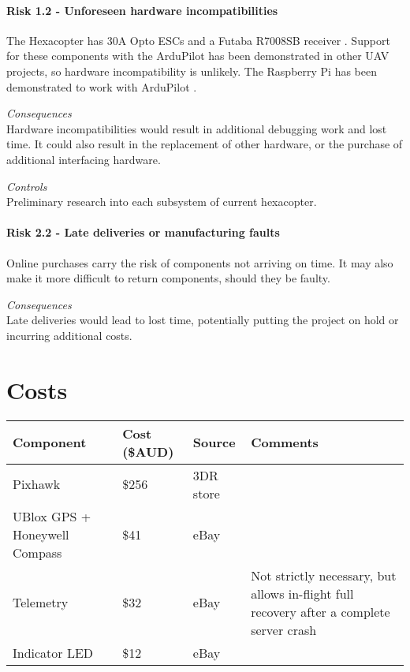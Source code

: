 \documentclass[a4paper, 11pt, titlepage]{article}
\begin{document}
\paragraph{Risk 1.2 - Unforeseen hardware incompatibilities}

The Hexacopter has 30A Opto ESCs and a Futaba R7008SB receiver \cite{futaba-pixhawk}. Support for these components with the ArduPilot has been demonstrated in other UAV projects, so hardware incompatibility is unlikely. The Raspberry Pi has been demonstrated to work with ArduPilot \cite{ardu-rpi-mavlink}. 

\textit{Consequences}\\
Hardware incompatibilities would result in additional debugging work and lost time. It could also result in the replacement of other hardware, or the purchase of additional interfacing hardware.

\textit{Controls}\\
Preliminary research into each subsystem of current hexacopter.

\paragraph{Risk 2.2 - Late deliveries or manufacturing faults}

Online purchases carry the risk of components not arriving on time. It may also make it more difficult to return components, should they be faulty. 

\textit{Consequences}\\
Late deliveries would lead to lost time, potentially putting the project on hold or incurring additional costs.

\section{Costs}
\begin{tabularx}{\textwidth}{XllX}
	\hline
    \textbf{Component} & \textbf{Cost (\$AUD)} & \textbf{Source} & \textbf{Comments} \\
    \hline
    Pixhawk & \$256 & 3DR store &  \\
    UBlox GPS + Honeywell Compass & \$41 & eBay  &  \\
    Telemetry & \$32 & eBay  & Not strictly necessary, but allows in-flight full recovery after a complete server crash \\
    Indicator LED & \$12 & eBay  &  \\
    \hline
\end{tabularx}
\end{document}
